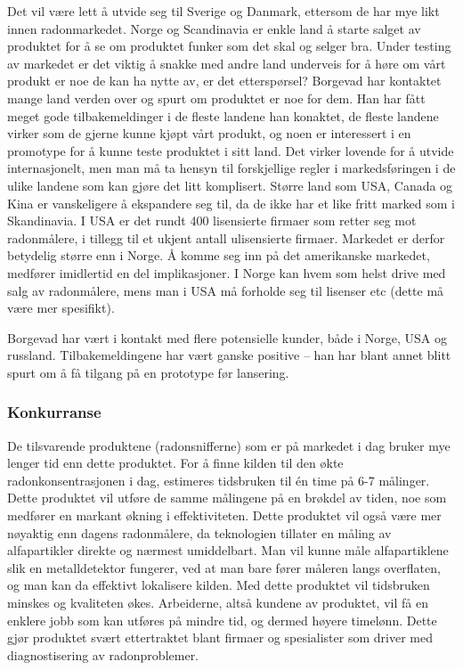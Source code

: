Det vil være lett å utvide seg til Sverige og Danmark, ettersom de har mye likt innen radonmarkedet. Norge og Scandinavia er enkle land å starte salget av produktet for å se om produktet funker som det skal og selger bra. Under testing av markedet er det viktig å snakke med andre land underveis for å høre om vårt produkt er noe de kan ha nytte av, er det etterspørsel? Borgevad har kontaktet mange land verden over og spurt om produktet er noe for dem. Han har fått meget gode tilbakemeldinger i de fleste landene han konaktet, de fleste landene virker som de gjerne kunne kjøpt vårt produkt, og noen er interessert i en promotype for å kunne teste produktet i sitt land. Det virker lovende for å utvide internasjonelt, men man må ta hensyn til forskjellige regler i markedsføringen i de ulike landene som kan gjøre det litt komplisert. Større land som USA, Canada og Kina er vanskeligere å ekspandere seg til, da de ikke har et like fritt marked som i Skandinavia.
I USA er det rundt 400 lisensierte firmaer som retter seg mot radonmålere, i tillegg til et ukjent antall ulisensierte firmaer.
Markedet er derfor betydelig større enn i Norge.
Å komme seg inn på det amerikanske markedet, medfører imidlertid en del implikasjoner.
I Norge kan hvem som helst drive med salg av radonmålere, mens man i USA må forholde seg til lisenser etc (dette må være mer spesifikt).

Borgevad har vært i kontakt med flere potensielle kunder, både i Norge, USA og russland.
Tilbakemeldingene har vært ganske positive – han har blant annet blitt spurt om å få tilgang på en prototype før lansering.


\subsubsection{Konkurranse}

De tilsvarende produktene (radonsnifferne) som er på markedet i dag bruker mye lenger tid enn dette produktet. For å finne kilden til den økte radonkonsentrasjonen i dag, estimeres tidsbruken til én time på 6-7 målinger. Dette produktet vil utføre de samme målingene på en brøkdel av tiden, noe som medfører en markant økning i effektiviteten. Dette produktet vil også være mer nøyaktig enn dagens radonmålere, da teknologien tillater en måling av alfapartikler direkte og nærmest umiddelbart. Man vil kunne måle alfapartiklene slik en metalldetektor fungerer, ved at man bare fører måleren langs overflaten, og man kan da effektivt lokalisere kilden. Med dette produktet vil tidsbruken minskes og kvaliteten økes. Arbeiderne, altså kundene av produktet, vil få en enklere jobb som kan utføres på mindre tid, og dermed høyere timelønn. Dette gjør produktet svært ettertraktet blant firmaer og spesialister som driver med diagnostisering av radonproblemer.

